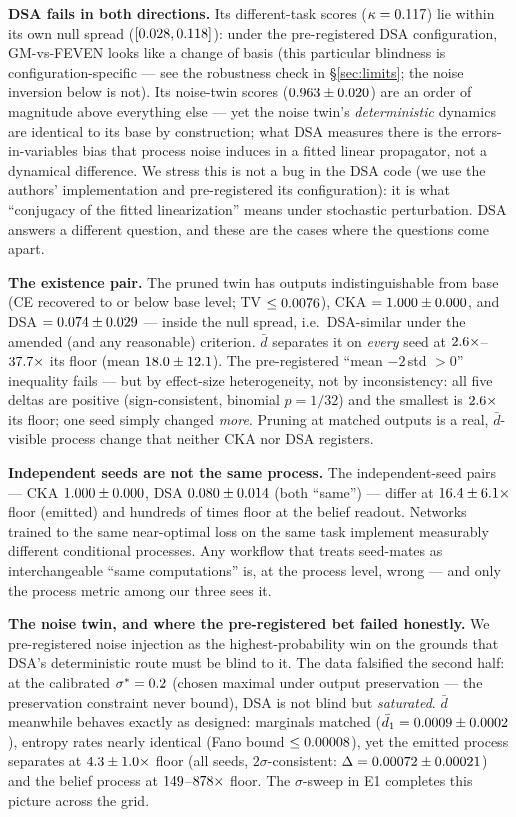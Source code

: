 \documentclass[11pt]{article}
\newcommand{\dbar}{\bar d}
\begin{document}
\textbf{DSA fails in both directions.} Its different-task scores
($\kappa = 0.117$) lie within its own null spread ($[0.028, 0.118]$):
under the pre-registered DSA configuration, GM-vs-FEVEN looks like a change of basis
(this particular blindness is configuration-specific --- see the robustness check in
\S\ref{sec:limits}; the noise inversion below is not). Its noise-twin scores
($0.963 \pm 0.020$) are an order of magnitude above everything else --- yet the noise twin's
\emph{deterministic} dynamics are identical to its base by construction; what DSA
measures there is the errors-in-variables bias that process noise induces in a fitted
linear propagator, not a dynamical difference. We stress this is not a bug in the DSA
code (we use the authors' implementation and pre-registered its configuration): it is
what ``conjugacy of the fitted linearization'' means under stochastic perturbation.
DSA answers a different question, and these are the cases where the questions come
apart.

\textbf{The existence pair.} The pruned twin has outputs indistinguishable from base
(CE recovered to or below base level; TV $\le 0.0076$), CKA $= 1.000 \pm 0.000$, and DSA
$= 0.074 \pm 0.029$ --- inside the null spread, i.e.\ DSA-similar under the amended (and any
reasonable) criterion. $\dbar$ separates it on \emph{every} seed at
$2.6\times$--$37.7\times$ its floor (mean $18.0 \pm 12.1$). The
pre-registered ``mean $- 2\,$std $> 0$'' inequality fails --- but by effect-size
heterogeneity, not by inconsistency: all five deltas are positive (sign-consistent,
binomial $p = 1/32$) and the smallest is $2.6\times$ its floor; one seed
simply changed \emph{more}. Pruning at matched outputs is a real, $\dbar$-visible
process change that neither CKA nor DSA registers.

\textbf{Independent seeds are not the same process.} The independent-seed pairs ---
CKA $1.000 \pm 0.000$, DSA $0.080 \pm 0.014$ (both ``same'') --- differ at $16.4 \pm 6.1\times$ floor
(emitted) and hundreds of times floor at the belief readout. Networks trained to the
same near-optimal loss on the same task implement measurably different conditional
processes. Any workflow that treats seed-mates as interchangeable ``same
computations'' is, at the process level, wrong --- and only the process metric among
our three sees it.

\textbf{The noise twin, and where the pre-registered bet failed honestly.} We
pre-registered noise injection as the highest-probability win on the grounds that
DSA's deterministic route must be blind to it. The data falsified the second half:
at the calibrated $\sigma^\ast = 0.2$ (chosen maximal under output
preservation --- the preservation constraint never bound), DSA is not blind but
\emph{saturated}. $\dbar$ meanwhile behaves exactly as designed: marginals matched
($\dbar_1 = \tvNoise$), entropy rates nearly identical (Fano bound
$\le 0.00008$), yet the emitted process separates at $4.3 \pm 1.0\times$ floor
(all seeds, $2\sigma$-consistent: $\Delta = 0.00072 \pm 0.00021$) and
the belief process at $149$--$878\times$ floor. The
$\sigma$-sweep in E1 completes this picture across the grid.
\end{document}
